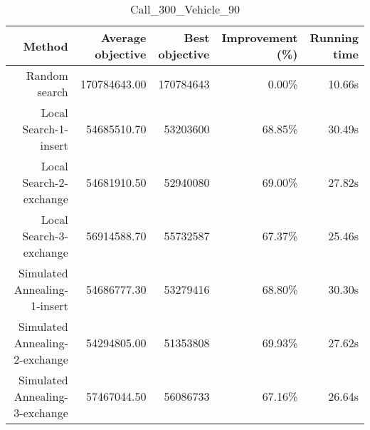 \begin{table}[ht]
\centering
\caption{Call\_300\_Vehicle\_90}
\label{tab:call300vehicle90}
\begin{tabular}{|r|r|r|r|r|}
Method & Average objective & Best objective & Improvement (\%) & Running time \\
\hline
Random search & 170784643.00 & 170784643 & 0.00\% & 10.66s\\
Local Search-1-insert & 54685510.70 & 53203600 & 68.85\% & 30.49s\\
Local Search-2-exchange & 54681910.50 & 52940080 & 69.00\% & 27.82s\\
Local Search-3-exchange & 56914588.70 & 55732587 & 67.37\% & 25.46s\\
Simulated Annealing-1-insert & 54686777.30 & 53279416 & 68.80\% & 30.30s\\
Simulated Annealing-2-exchange & 54294805.00 & 51353808 & 69.93\% & 27.62s\\
Simulated Annealing-3-exchange & 57467044.50 & 56086733 & 67.16\% & 26.64s\\
\end{tabular}%
\end{table}
